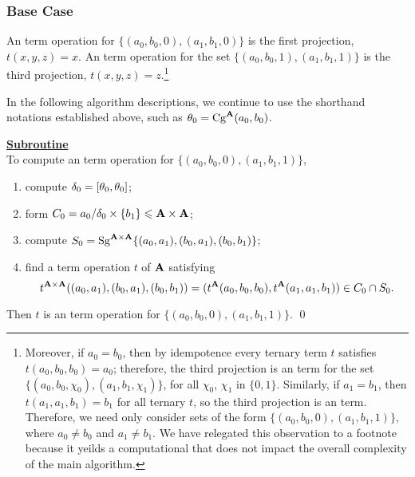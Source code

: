 \subsubsection{Base Case}
\label{sec:size2}
An \ld term operation for 
$\{(a_0,b_0,0), (a_1, b_1, 0)\}$ is the first projection,
$t(x,y,z) = x$.
An \ld term operation for
the set $\{(a_0,b_0,1), (a_1, b_1, 1)\}$ is the third projection,
$t(x,y,z) = z$.\footnote{Moreover, if $a_0 = b_0$, then by idempotence every ternary term $t$ 
satisfies $t(a_0, b_0, b_0) = a_0$; therefore, the third projection is an \ld 
term for the set $\{(a_0,b_0,\chi_0), (a_1, b_1, \chi_1)\}$, 
for all $\chi_0$, $\chi_1$ in $\{0,1\}$. 
Similarly, if $a_1 = b_1$, then $t(a_1, a_1, b_1) = b_1$ for all ternary $t$, 
so the third projection is an \ld term.
Therefore, we need only consider sets of the form
$\{(a_0,b_0, 0), (a_1, b_1, 1)\}$, where $a_0 \neq b_0$ and 
$a_1 \neq b_1$.  
We have relegated this observation to a footnote because it yeilds a computational 
that does not impact the overall complexity of the main algorithm.} 


In the following algorithm descriptions,
we continue to use the shorthand notations established above, 
such as $\theta_0 = \operatorname{Cg}^{\mathbf{A}}(a_0, b_0)$.

\bigskip

\noindent \underline{\textbf{Subroutine }}\\
To compute an \ld term operation for $\{(a_0,b_0,0), (a_1, b_1, 1)\}$,
\begin{enumerate}
\item compute $\delta_0=[\theta_0, \theta_0]$;
\item form $C_0= a_0/\delta_0 \times \{b_1\} \leqslant \mathbf{A}\times\mathbf{A}$;
\item compute
      $S_0=\operatorname{Sg}^{\mathbf{A}\times \mathbf{A}} \{(a_0,a_1),(b_0,a_1),(b_0,b_1)\}$;
\item find a term operation $t$ of $\mathbf{A}$ satisfying
\[t^{\mathbf{A}\times\mathbf{A}}((a_0,a_1),(b_0,a_1),(b_0,b_1)) =
 (t^{\mathbf{A}}(a_0,b_0,b_0), t^{\mathbf{A}}(a_1,a_1,b_1)) \in C_0 \cap S_0.\]
\end{enumerate}
Then $t$ is an \ld term operation for
$\{(a_0, b_0, 0), (a_1, b_1, 1)\}$.
\qed

